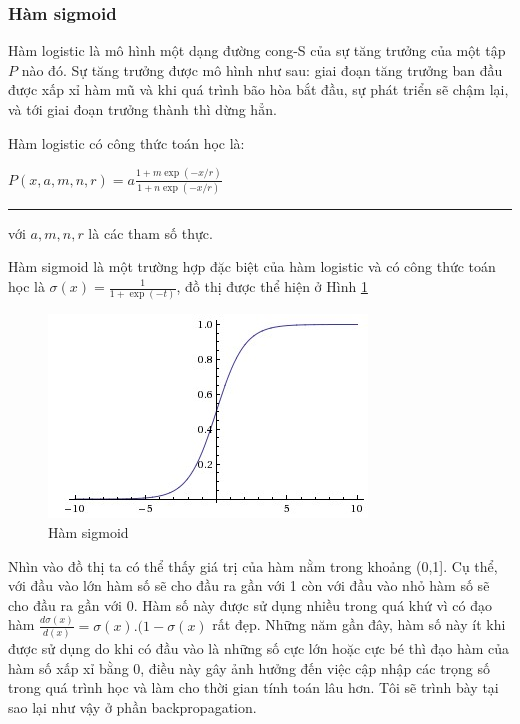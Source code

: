 \subsubsection{ Hàm sigmoid}
	 \hspace{5mm} Hàm logistic là mô hình một dạng đường cong-S của sự tăng trưởng của một tập $P$ nào đó. Sự tăng trưởng được mô hình như sau: giai đoạn tăng trưởng ban đầu được xấp xỉ hàm mũ và khi quá trình bão hòa bắt đầu, sự phát triển sẽ chậm lại, và tới giai đoạn trưởng thành thì dừng hẳn. \par 
	 Hàm logistic có công thức toán học là: 
	 \begin{center}
	 	$P(x,a,m,n,r) = a\frac{1+m\exp({-x/r})}{1+n\exp({-x/r})}$ \rule{5mm}{0pt} với $a,m,n,r$ là các tham số thực.
	 \end{center}
	 \par
	  Hàm sigmoid là một trường hợp đặc biệt của hàm logistic và có công thức toán học là $\sigma(x) = \frac{1}{1+\exp({-t})}$, đồ thị được thể hiện ở Hình \ref{fig:sigmoid}
\begin{center}
 	\begin{figure}[htp]
    \begin{center}
    \includegraphics[scale=1]{chap3/image/sigmoid.jpeg}
    \end{center}
    \caption{Hàm sigmoid}
    \label{fig:sigmoid}
    \end{figure}
\end{center}
\hspace{5mm} Nhìn vào đồ thị ta có thể thấy giá trị của hàm nằm trong khoảng (0,1]. Cụ thể, với đầu vào lớn hàm số sẽ cho đầu ra gần với 1 còn với đầu vào nhỏ hàm số sẽ cho đầu ra gần với 0. Hàm số này được sử dụng nhiều trong quá khứ vì có đạo hàm $\frac{d\sigma(x)}{d(x)} = \sigma(x).(1-\sigma(x)$ rất đẹp. Những năm gần đây, hàm số này ít khi được sử dụng do khi có đầu vào là những số cực lớn hoặc cực bé thì đạo hàm của hàm số xấp xỉ bằng 0, điều này gây ảnh hưởng đến việc cập nhập các trọng số trong quá trình học và làm cho thời gian tính toán lâu hơn. Tôi sẽ trình bày tại sao lại như vậy ở phần backpropagation.
	
